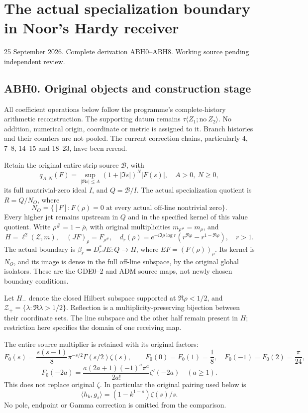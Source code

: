 \section{The actual specialization boundary in Noor's Hardy
receiver}\label{the-actual-specialization-boundary-in-noors-hardy-receiver}

25 September 2026. Complete derivation ABH0--ABH8. Working source
pending independent review.

\subsection{ABH0. Original objects and construction
stage}\label{abh0.-original-objects-and-construction-stage}

All coefficient operations below follow the programme's complete-history
arithmetic reconstruction. The supporting datum remains
\(\tau\langle Z_1;\mathrm{no}\ Z_2\rangle\). No addition, numerical
origin, coordinate or metric is assigned to it. Branch histories and
their counters are not pooled. The current correction chains,
particularly 4, 7--8, 14--15 and 18--23, have been reread.

Retain the original entire strip source \(\mathcal B\), with \[
q_{A,N}(F)=\sup_{|\Re s|\le A}(1+|\Im s|)^N|F(s)|,\quad A>0,\ N\ge0,
\] its full nontrivial-zero ideal \(I\), and \(Q=\mathcal B/I\). The
actual specialization quotient is \(R=Q/N_O\), where \[
N_O=\{[F]:F(\rho)=0\text{ at every actual off-line nontrivial zero}\}.
\tag{ABH0.1}
\] Every higher jet remains upstream in \(Q\) and in the specified
kernel of this value quotient. Write \(\rho^\#=1-\bar\rho\), with
original multiplicities \(m_{\rho^\#}=m_\rho\), and \[
H=\ell^2(\mathscr Z,m),\quad (JF)_\rho=F_{\rho^\#},\quad
d_r(\rho)=e^{-i\Im\rho\log r}(r^{\Re\rho}-r^{1-\Re\rho}),\quad r>1.
\] The actual boundary is \(\beta_r=D_r^*JE:Q\to H\), where
\(EF=(F(\rho))_\rho\). Its kernel is \(N_O\), and its image is dense in
the full off-line subspace, by the original global isolators. These are
the GDE0--2 and ADM source maps, not newly chosen boundary conditions.

Let \(H_-\) denote the closed Hilbert subspace supported at
\(\Re\rho<1/2\), and \(\mathscr Z_+=\{\lambda:\Re\lambda>1/2\}\).
Reflection is a multiplicity-preserving bijection between their
coordinate sets. The line subspace and the other half remain present in
\(H\); restriction here specifies the domain of one receiving map.

The entire source multiplier is retained with its original factors: \[
F_0(s)=\frac{s(s-1)}8\pi^{-s/2}\Gamma(s/2)\zeta(s),\qquad
F_0(0)=F_0(1)=\frac18,\quad F_0(-1)=F_0(2)=\frac\pi{24},
\] \[
F_0(-2a)=\frac{a(2a+1)(-1)^a\pi^a}{2a!}\zeta'(-2a)\quad(a\ge1).
\tag{ABH0.2}
\] This does not replace original \(\zeta\). In particular the original
pairing used below is \[
\langle h_k,g_s\rangle=(1-k^{1-s})\zeta(s)/s.
\tag{ABH0.3}
\] No pole, endpoint or Gamma correction is omitted from the comparison.

